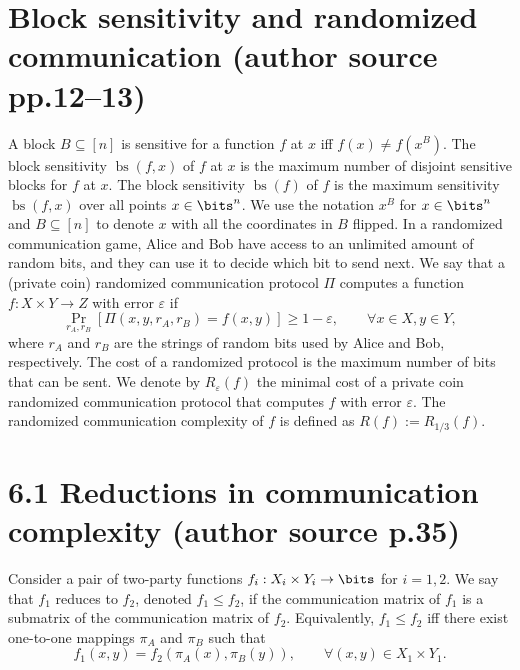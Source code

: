 \section*{Block sensitivity and randomized communication (author source pp.12--13)}
A block $B\subseteq[n]$ is sensitive for a function $f$ at $x$ iff $f(x)\ne f(x^B)$. The block sensitivity $\operatorname{bs}(f,x)$ of $f$ at $x$ is the maximum number of disjoint sensitive blocks for $f$ at $x$. The block sensitivity $\operatorname{bs}(f)$ of $f$ is the maximum sensitivity $\operatorname{bs}(f,x)$ over all points $x\in\bits^n$.
We use the notation $x^B$ for $x\in\bits^n$ and $B\subseteq[n]$ to denote $x$ with all the coordinates in $B$ flipped.
In a randomized communication game, Alice and Bob have access to an unlimited amount of random bits, and they can use it to decide which bit to send next. We say that a (private coin) randomized communication protocol $\Pi$ computes a function $f:X\times Y\to Z$ with error $\varepsilon$ if
\[\Pr_{r_A,r_B}[\Pi(x,y,r_A,r_B)=f(x,y)]\ge1-\varepsilon,\qquad\forall x\in X,y\in Y,\]
where $r_A$ and $r_B$ are the strings of random bits used by Alice and Bob, respectively. The cost of a randomized protocol is the maximum number of bits that can be sent. We denote by $R_\varepsilon(f)$ the minimal cost of a private coin randomized communication protocol that computes $f$ with error $\varepsilon$. The randomized communication complexity of $f$ is defined as $R(f):=R_{1/3}(f)$.
\section*{6.1 Reductions in communication complexity (author source p.35)}
Consider a pair of two-party functions $f_i:X_i\times Y_i\to\bits$ for $i=1,2$. We say that $f_1$ reduces to $f_2$, denoted $f_1\le f_2$, if the communication matrix of $f_1$ is a submatrix of the communication matrix of $f_2$. Equivalently, $f_1\le f_2$ iff there exist one-to-one mappings $\pi_A$ and $\pi_B$ such that
\[f_1(x,y)=f_2(\pi_A(x),\pi_B(y)),\qquad\forall(x,y)\in X_1\times Y_1.\]
